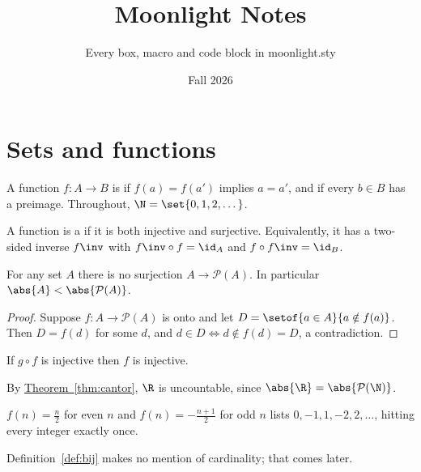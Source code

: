 \documentclass[10pt]{article}
\title{Moonlight Notes}
\author{Every box, macro and code block in moonlight.sty}
\date{Fall 2026}
\begin{document}
\maketitle

\section{Sets and functions}

A function $f\colon A \to B$ is  if $f(a) = f(a')$ implies $a = a'$,
and  if every $b \in B$ has a preimage. Throughout, $\N = \set{0, 1, 2, \dots}$.

\begin{definition}[Bijection]\label{def:bij}
  A function is a  if it is both injective and surjective. Equivalently,
  it has a two-sided inverse $f\inv$ with $f\inv \circ f = \id_A$ and $f \circ f\inv = \id_B$.
\end{definition}

\begin{theorem}[Cantor]\label{thm:cantor}
  For any set $A$ there is no surjection $A \to \mathcal{P}(A)$. In particular
  $\abs{A} < \abs{\mathcal{P}(A)}$.
\end{theorem}

\begin{proof}
  Suppose $f\colon A \to \mathcal{P}(A)$ is onto and let $D = \setof{a \in A}{a \notin f(a)}$.
  Then $D = f(d)$ for some $d$, and $d \in D \iff d \notin f(d) = D$, a contradiction.
\end{proof}

\begin{lemma}
  If $g \circ f$ is injective then $f$ is injective.
\end{lemma}
\begin{corollary}
  By \hyperref[thm:cantor]{Theorem~\ref*{thm:cantor}}, $\R$ is uncountable, since $\abs{\R} = \abs{\mathcal{P}(\N)}$.
\end{corollary}

\begin{example}[A bijection $\N \to \Z$]
  $f(n) = \frac{n}{2}$ for even $n$ and $f(n) = -\frac{n+1}{2}$ for odd $n$ lists
  $0, -1, 1, -2, 2, \dots$, hitting every integer exactly once.
\end{example}

\begin{remark}
  Definition~\ref{def:bij} makes no mention of cardinality; that comes later.
\end{remark}
\end{document}
